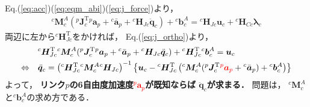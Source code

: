 ﻿\documentclass[a4paper]{jsarticle}
\begin{document}
Eq.(\ref{eq:acc})(\ref{eq:eqm_abi})(\ref{eq:j_force})より，
\begin{align}
{}^{c}\bm{M}^{A}_{c}
({}^{p}\bm{J}_{c}^{\mathrm{T}}{}^{p}\bm{a}_{p}+{}^{c}\bar{\bm{a}}_{p}
+{}^{c}\bm{H}_{Jc}\ddot{\bm{q}}_{c})
+{}^{c}\bm{b}^{A}_{c}=
{}^{c}\bm{H}_{Jc}\bm{u}_{c}+{}^{c}\bm{H}_{Cc}\bm{\lambda}_{c}
\label{eq:eqm_abi_force_decomp}
\end{align}
両辺に左から${}^{c}\bm{H}_{Jc}^{\mathrm{T}}$をかければ，
Eq.(\ref{eq:j_ortho})より，
\begin{align}
&{}^{c}\bm{H}_{Jc}^{\mathrm{T}}{}^{c}\bm{M}^{A}_{c}
({}^{p}\bm{J}_{c}^{\mathrm{T}}{}^{p}\bm{a}_{p}+{}^{c}\bar{\bm{a}}_{p}
+{}^{c}\bm{H}_{Jc}\ddot{\bm{q}}_{c})
 +{}^{c}\bm{H}_{Jc}^{\mathrm{T}}{}^{c}\bm{b}^{A}_{c}=\bm{u}_{c} \nonumber \\
\Leftrightarrow\quad&
\ddot{\bm{q}}_{c}
=\left({}^{c}\bm{H}_{Jc}^{\mathrm{T}}{}^{c}\bm{M}^{A}_{c}{}^{c}\bm{H}_{Jc}\right)^{-1}
\left\{\bm{u}_{c}
 -{}^{c}\bm{H}_{Jc}^{\mathrm{T}}\left({}^{c}\bm{M}^{A}_{c}
  ({}^{p}\bm{J}_{c}^{\mathrm{T}}\textcolor{red}{{}^{p}\bm{a}_{p}}+{}^{c}\bar{\bm{a}}_{p})
  +{}^{c}\bm{b}^{A}_{c}\right)
\right\}
\label{eq:recurs_acc}
\end{align}
よって，
{\bf リンク$p$の6自由度加速度\textcolor{red}{${}^{p}\bm{a}_{p}$}が既知ならば
$\ddot{\bm{q}}_{c}$が求まる．}
問題は，
${}^{c}\bm{M}^{A}_{c}$と${}^{c}\bm{b}^{A}_{c}$の求め方である．
\end{document}
